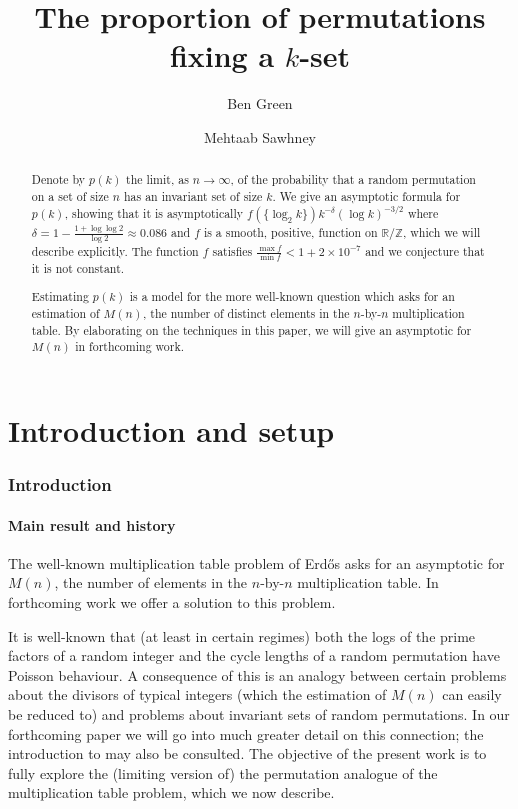 \documentclass[11pt,reqno]{amsart}
\title{The proportion of permutations fixing a $k$-set}
\author[A1]{Ben Green}
\author[A2]{Mehtaab Sawhney}
\numberwithin{equation}{section}
\theoremstyle{definition}
\theoremstyle{remark}
\newcommand\Z{\mathbb{Z}}
\newcommand\R{\mathbb{R}}
\begin{document}
\begin{abstract} 
Denote by $p(k)$ the limit, as $n \rightarrow \infty$, of the probability that a random permutation on a set of size $n$ has an invariant set of size $k$. We give an asymptotic formula for $p(k)$, showing that it is asymptotically $f(\{\log_2 k\}) k^{-\delta} (\log k)^{-3/2}$ where $\delta = 1 - \frac{1 + \log \log 2}{\log 2} \approx 0.086$ and $f$ is a smooth, positive, function on $\R/\Z$, which we will describe explicitly. The function $f$ satisfies $\frac{\max f}{\min f} < 1 + 2 \times 10^{-7}$ and we conjecture that it is not constant.

Estimating $p(k)$ is a model for the more well-known question which asks for an estimation of $M(n)$, the number of distinct elements in the $n$-by-$n$ multiplication table. By elaborating on the techniques in this paper, we will give an asymptotic for $M(n)$ in forthcoming work.
\end{abstract}

\maketitle
\setcounter{tocdepth}{1}

\tableofcontents

\part{Introduction and setup}

\section{Introduction}

\subsection{Main result and history}
The well-known multiplication table problem of Erd\H{o}s \cite{erdos-mult-1,erdos-mult-2} asks for an asymptotic for $M(n)$, the number of elements in the $n$-by-$n$ multiplication table. In forthcoming work \cite{green-sawhney-forthcoming} we offer a solution to this problem.

It is well-known that (at least in certain regimes) both the logs of the prime factors of a random integer and the cycle lengths of a random permutation have Poisson behaviour. A consequence of this is an analogy between certain problems about the divisors of typical integers (which the estimation of $M(n)$ can easily be reduced to) and problems about invariant sets of random permutations.  In our forthcoming paper we will go into much greater detail on this connection; the introduction to \cite{EFG16} may also be consulted. The objective of the present work is to fully explore the (limiting version of) the permutation analogue of the multiplication table problem, which we now describe.
\end{document}
